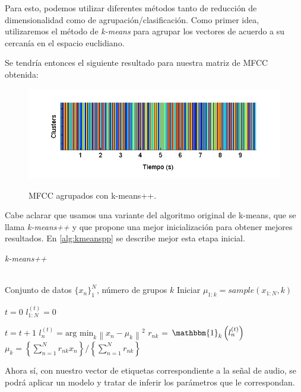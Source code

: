 Para esto, podemos utilizar diferentes métodos tanto de reducción de dimensionalidad como de agrupación/clasificación. Como primer idea, utilizaremos el método de \textit{k-means} para agrupar los vectores de acuerdo a su cercanía en el espacio euclidiano.

Se tendría entonces el siguiente resultado para nuestra matriz de MFCC obtenida:
\begin{figure}[bth]
  {\includegraphics[width=0.9\linewidth]{gfx/chap2/signal-clusters}} \quad
  \caption{MFCC agrupados con k-means++.}
  \label{fig:sign_clusters}
\end{figure}
Cabe aclarar que usamos una variante del algoritmo original de k-means, que se llama \textit{k-means++} y que propone una mejor inicialización para obtener mejores resultados. En \autoref{alg:kmeanspp} se describe mejor esta etapa inicial.

\begin{algorithm}[tp]
   \caption{\textit{k-means++}}
   \label{alg:kmeanspp}
\begin{algorithmic}
    \\ Conjunto de datos $\lbrace x_n \rbrace_1^N $, número de grupos $k$
   \STATE Iniciar $\mu_{1:k} = sample(x_{1:N}, k)$   
   
   \STATE $t = 0$
   \STATE $l_{1:N}^{(t)} = 0$
      
   \REPEAT  
   \STATE $t=t+1$ 
   \STATE $l_n^{(t)} = \text{arg min}_k {\left \| x_n - \mu_k \right \|}^2 $
   \STATE $r_{nk}$ = $\mathbbm{1}_k\left(l_n^{(t)}\right)$
   \STATE $\mu_k = \left\lbrace {\sum_{n=1}^N r_{nk} x_n} \right\rbrace / \left\lbrace {\sum_{n=1}^N r_{nk}} \right\rbrace $
\end{algorithmic}
\end{algorithm}

Ahora sí, con nuestro vector de etiquetas correspondiente a la señal de audio, se podrá aplicar un modelo y tratar de inferir los parámetros que le correspondan.


